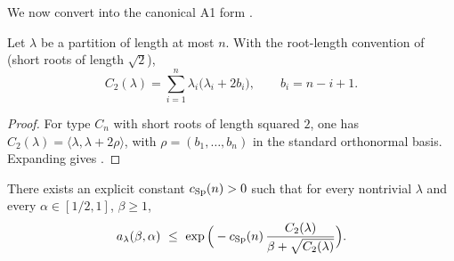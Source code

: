 We now convert  into the canonical A1 form .

\begin{lemma}
\label{lem:Sp_casimir_partition}
Let $\lambda$ be a partition of length at most $n$.
With the root-length convention of  (short roots of length $\sqrt2$),
\begin{equation}
\label{eq:Sp_casimir_formula}
C_2(\lambda)=\sum_{i=1}^n \lambda_i\big(\lambda_i+2b_i\big),\qquad b_i=n-i+1.
\end{equation}
\end{lemma}

\begin{proof}
For type $C_n$ with short roots of length squared $2$, one has $C_2(\lambda)=\langle\lambda,\lambda+2\rho\rangle$,
with $\rho=(b_1,\dots,b_n)$ in the standard orthonormal basis.
Expanding gives .
\end{proof}

\begin{proposition}
\label{prop:Sp_crossover_bound}
There exists an explicit constant $c_{\mathrm{Sp}}(n)>0$ such that for every nontrivial $\lambda$ and every $\alpha\in[1/2,1]$, $\beta\ge 1$,
\begin{equation}
\label{eq:Sp_A1_final}
 a_{\lambda}(\beta,\alpha)
\ \le\
\exp\Big(-c_{\mathrm{Sp}}(n)\,\frac{C_2(\lambda)}{\beta+\sqrt{C_2(\lambda)}}\Big).
\end{equation}
\end{proposition}

